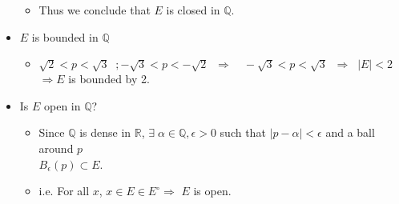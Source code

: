 \documentclass[12pt]{article}
\begin{document}
\begin{itemize}
\begin{itemize}
                \item Thus we conclude that $E$ is closed in $\mathbb{Q}$.
        \end{itemize}
        
    \item $E$ is bounded in $\mathbb{Q}$
        \begin{itemize}
            \item $\sqrt{2} < p < \sqrt{3}\;\; ; -\sqrt{3} < p < -\sqrt{2} \;\; \Rightarrow \quad -\sqrt{3} < p < \sqrt{3}\;\;\Rightarrow \;\;|E| < 2$  \\
            $\Rightarrow E$ is bounded by 2.
        \end{itemize}
    
    \item Is $E$ open in $\mathbb{Q}$?
        \begin{itemize}
            \item Since $\mathbb{Q}$ is dense in $\mathbb{R}$, $\exists\; \alpha \in \mathbb{Q}, \epsilon >0$ such that $|p-\alpha| < \epsilon $ and a ball around $p\;$\\$ B_\epsilon(p) \subset E$.
            \item i.e. For all $x$, $x \in E \in E^\circ \Rightarrow$ $E$ is open.
        \end{itemize}
        
\end{itemize}
\end{document}
